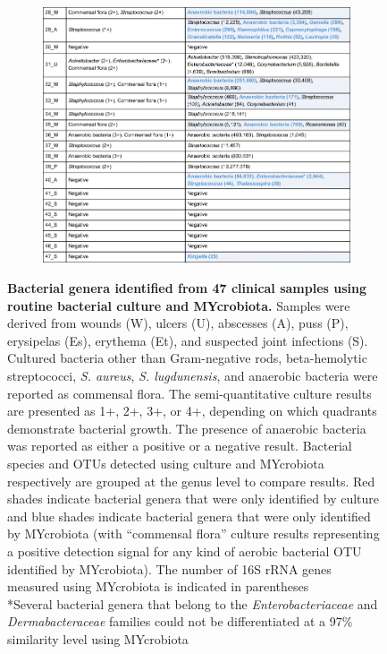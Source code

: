 \begin{figure}\ContinuedFloat
\begin{subfigure}{\textwidth}
 \centering
 \includegraphics[scale=0.5]{chapters/images/mycrobiota/mycrobiota-table1b.png}
\end{subfigure}
\caption{\textbf{Bacterial genera identified from 47 clinical samples using routine bacterial culture and MYcrobiota.} Samples were derived from wounds (W), ulcers (U), abscesses (A), puss (P), erysipelas (Es), erythema (Et), and suspected joint infections (S). Cultured bacteria other than Gram-negative rods, beta-hemolytic streptococci, \textit{S. aureus}, \textit{S. lugdunensis}, and anaerobic bacteria were reported as commensal flora. The semi-quantitative culture results are presented as 1+, 2+, 3+, or 4+, depending on which quadrants demonstrate bacterial growth. The presence of anaerobic bacteria was reported as either a positive or a negative result. Bacterial species and OTUs detected using culture and MYcrobiota respectively are grouped at the genus level to compare results. Red shades indicate bacterial genera that were only identified by culture and blue shades indicate bacterial genera that were only identified by MYcrobiota (with “commensal flora” culture results representing a positive detection signal for any kind of aerobic bacterial OTU identified by MYcrobiota). The number of 16S rRNA genes measured using MYcrobiota is indicated in parentheses \\ *Several bacterial genera that belong to the \textit{Enterobacteriaceae} and \textit{Dermabacteraceae} families could not be differentiated at a 97\% similarity level using MYcrobiota}\label{table:samples}
\end{figure}

